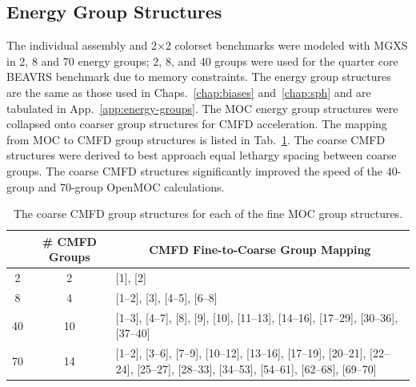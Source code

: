 \subsection{Energy Group Structures}
\label{subsec:chap8-energy-groups}

The individual assembly and 2$\times$2 colorset benchmarks were modeled with \ac{MGXS} in 2, 8 and 70 energy groups; 2, 8, and 40 groups were used for the quarter core \ac{BEAVRS} benchmark due to memory constraints. The energy group structures are the same as those used in Chaps.~\ref{chap:biases} and~\ref{chap:sph} and are tabulated in App.~\ref{app:energy-groups}. The \ac{MOC} energy group structures were collapsed onto coarser group structures for \ac{CMFD} acceleration. The mapping from \ac{MOC} to \ac{CMFD} group structures is listed in Tab.~\ref{table:chap8-coarse-cmfd-groups}. The coarse \ac{CMFD} structures were derived to best approach equal lethargy spacing between coarse groups. The coarse \ac{CMFD} structures significantly improved the speed of the 40-group and 70-group OpenMOC calculations.

\begin{table}[h!]
  \centering
  \caption[Coarse \ac{CMFD} group structures]{The coarse \ac{CMFD} group structures for each of the fine \ac{MOC} group structures.}
  \small
  \label{table:chap8-coarse-cmfd-groups}
  \vspace{6pt}
  \begin{tabular}{p{1.5cm} p{1.5cm} p{7.2cm}}
  \toprule
  \rowcolor{lightgray}
  \multicolumn{1}{c}{\cellcolor{lightgray} \textbf{\# \ac{MOC} Groups}} &
  \multicolumn{1}{c}{\cellcolor{lightgray} \textbf{\# \ac{CMFD} Groups}} &
  \multicolumn{1}{c}{\cellcolor{lightgray} \textbf{\ac{CMFD} Fine-to-Coarse Group Mapping}} \\
  \midrule
  \multicolumn{1}{c}{2} & \multicolumn{1}{c}{2} & [1], [2] \\
  \midrule
  \multicolumn{1}{c}{8} & \multicolumn{1}{c}{4} & [1--2], [3], [4--5], [6--8] \\
  \midrule
  \multicolumn{1}{c}{40} & \multicolumn{1}{c}{10} & [1--3], [4--7], [8], [9], [10], [11--13], \hspace{0.8cm} [14--16], [17--29], [30--36], [37--40] \\
  \midrule
  \multicolumn{1}{c}{70} & \multicolumn{1}{c}{14} & [1--2], [3--6], [7--9], [10--12], [13--16], \hspace{0.6cm} [17--19], [20--21], [22--24], [25--27], [28--33], [34--53], [54--61], [62--68], [69--70] \\ 
  \bottomrule
\end{tabular}
\end{table}

